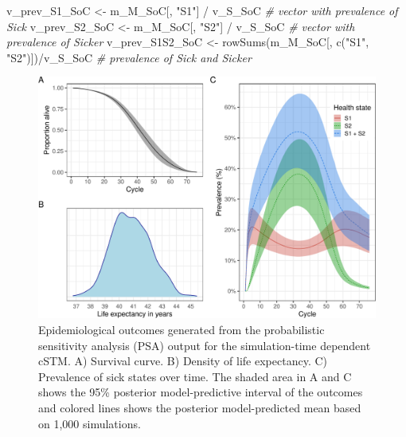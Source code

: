 \documentclass[
]{article}
\newenvironment{Shaded}{\begin{snugshade}}{\end{snugshade}}
\newcommand{\CommentTok}[1]{\textcolor[rgb]{0.56,0.35,0.01}{\textit{#1}}}
\newcommand{\FunctionTok}[1]{\textcolor[rgb]{0.00,0.00,0.00}{#1}}
\newcommand{\NormalTok}[1]{#1}
\newcommand{\OtherTok}[1]{\textcolor[rgb]{0.56,0.35,0.01}{#1}}
\newcommand{\SpecialCharTok}[1]{\textcolor[rgb]{0.00,0.00,0.00}{#1}}
\newcommand{\StringTok}[1]{\textcolor[rgb]{0.31,0.60,0.02}{#1}}
\begin{document}
\begin{Shaded}
\begin{Highlighting}[]
\NormalTok{v\_prev\_S1\_SoC   }\OtherTok{\textless{}{-}}\NormalTok{ m\_M\_SoC[, }\StringTok{"S1"}\NormalTok{] }\SpecialCharTok{/}\NormalTok{ v\_S\_SoC          }\CommentTok{\# vector with prevalence of Sick}
\NormalTok{v\_prev\_S2\_SoC   }\OtherTok{\textless{}{-}}\NormalTok{ m\_M\_SoC[, }\StringTok{"S2"}\NormalTok{] }\SpecialCharTok{/}\NormalTok{ v\_S\_SoC          }\CommentTok{\# vector with prevalence of Sicker}
\NormalTok{v\_prev\_S1S2\_SoC }\OtherTok{\textless{}{-}} \FunctionTok{rowSums}\NormalTok{(m\_M\_SoC[, }\FunctionTok{c}\NormalTok{(}\StringTok{"S1"}\NormalTok{, }\StringTok{"S2"}\NormalTok{)])}\SpecialCharTok{/}\NormalTok{v\_S\_SoC }\CommentTok{\# prevalence of Sick and Sicker}
\end{Highlighting}
\end{Shaded}

\begin{figure}[H]

{\centering \includegraphics{figs/PSA-EPI-figures-1} 

}

\caption{Epidemiological outcomes generated from the probabilistic sensitivity analysis (PSA) output for the simulation-time dependent cSTM. A) Survival curve. B) Density of life expectancy. C) Prevalence of sick states over time. The shaded area in A and C shows the 95\% posterior model-predictive interval of the outcomes and colored lines shows the posterior model-predicted mean based on 1,000 simulations.}\label{fig:PSA-EPI-figures}
\end{figure}
\end{document}
